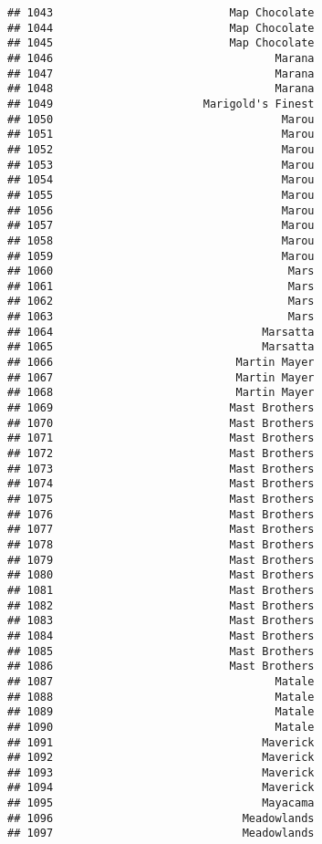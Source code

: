 \documentclass[
]{article}
\begin{document}
\begin{verbatim}
## 1043                           Map Chocolate
## 1044                           Map Chocolate
## 1045                           Map Chocolate
## 1046                                  Marana
## 1047                                  Marana
## 1048                                  Marana
## 1049                       Marigold's Finest
## 1050                                   Marou
## 1051                                   Marou
## 1052                                   Marou
## 1053                                   Marou
## 1054                                   Marou
## 1055                                   Marou
## 1056                                   Marou
## 1057                                   Marou
## 1058                                   Marou
## 1059                                   Marou
## 1060                                    Mars
## 1061                                    Mars
## 1062                                    Mars
## 1063                                    Mars
## 1064                                Marsatta
## 1065                                Marsatta
## 1066                            Martin Mayer
## 1067                            Martin Mayer
## 1068                            Martin Mayer
## 1069                           Mast Brothers
## 1070                           Mast Brothers
## 1071                           Mast Brothers
## 1072                           Mast Brothers
## 1073                           Mast Brothers
## 1074                           Mast Brothers
## 1075                           Mast Brothers
## 1076                           Mast Brothers
## 1077                           Mast Brothers
## 1078                           Mast Brothers
## 1079                           Mast Brothers
## 1080                           Mast Brothers
## 1081                           Mast Brothers
## 1082                           Mast Brothers
## 1083                           Mast Brothers
## 1084                           Mast Brothers
## 1085                           Mast Brothers
## 1086                           Mast Brothers
## 1087                                  Matale
## 1088                                  Matale
## 1089                                  Matale
## 1090                                  Matale
## 1091                                Maverick
## 1092                                Maverick
## 1093                                Maverick
## 1094                                Maverick
## 1095                                Mayacama
## 1096                             Meadowlands
## 1097                             Meadowlands

\end{verbatim}
\end{document}
